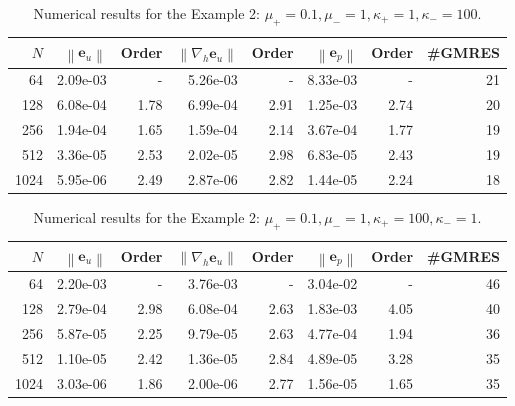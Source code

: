 \documentclass[preprint,11pt]{elsarticle}
\theoremstyle{remark}
\newcommand{\bm}[1]{\boldsymbol{#1}}
\newcommand{\norm}[1]{\left\lVert #1 \right\rVert}
\begin{document}
\begin{table}[htbp]
\centering
\caption{Numerical results for the Example 2: $\mu_+ = 0.1, \mu_- = 1, \kappa_+ = 1, \kappa_- = 100$.}
\label{tab:eg2-3}
\begin{tabular}{r r r r r r r r}
\hline
$N$ & $\norm{\bm e_u}$ & Order & $\norm{\nabla_h \bm e_u}$ & Order & $\norm{\bm e_p}$ & Order & \#GMRES \\
\hline
  64  & 2.09e-03 & - & 5.26e-03 & - & 8.33e-03 & - & 21 \\
 128  & 6.08e-04 & 1.78 & 6.99e-04 & 2.91 & 1.25e-03 & 2.74 & 20 \\
 256  & 1.94e-04 & 1.65 & 1.59e-04 & 2.14 & 3.67e-04 & 1.77 & 19 \\
 512  & 3.36e-05 & 2.53 & 2.02e-05 & 2.98 & 6.83e-05 & 2.43 & 19 \\
1024  & 5.95e-06 & 2.49 & 2.87e-06 & 2.82 & 1.44e-05 & 2.24 & 18 \\
\hline
\end{tabular}
\end{table}

\begin{table}[htbp]
\centering
\caption{Numerical results for the Example 2: $\mu_+ = 0.1, \mu_- = 1, \kappa_+ = 100, \kappa_- = 1$.}
\label{tab:eg2-4}
\begin{tabular}{r r r r r r r r}
\hline
$N$ & $\norm{\bm e_u}$ & Order & $\norm{\nabla_h \bm e_u}$ & Order & $\norm{\bm e_p}$ & Order & \#GMRES \\
\hline
  64  & 2.20e-03 & - & 3.76e-03 & - & 3.04e-02 & - & 46 \\
 128  & 2.79e-04 & 2.98 & 6.08e-04 & 2.63 & 1.83e-03 & 4.05 & 40 \\
 256  & 5.87e-05 & 2.25 & 9.79e-05 & 2.63 & 4.77e-04 & 1.94 & 36 \\
 512  & 1.10e-05 & 2.42 & 1.36e-05 & 2.84 & 4.89e-05 & 3.28 & 35 \\
1024  & 3.03e-06 & 1.86 & 2.00e-06 & 2.77 & 1.56e-05 & 1.65 & 35 \\
\hline
\end{tabular}
\end{table}
\end{document}
